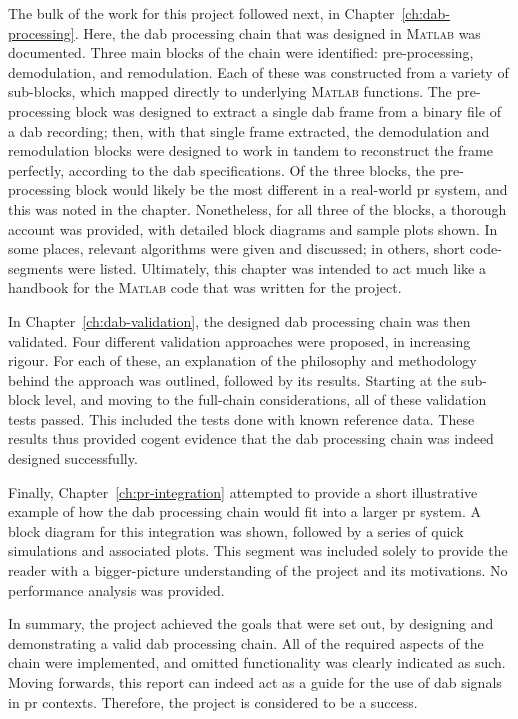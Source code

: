 \documentclass[class=report,11pt,crop=false]{standalone}
\begin{document}
The bulk of the work for this project followed next, in Chapter~\ref{ch:dab-processing}. Here, the \gls{dab} processing chain that was designed in \textsc{Matlab} was documented. Three main blocks of the chain were identified: pre-processing, demodulation, and remodulation. Each of these was constructed from a variety of sub-blocks, which mapped directly to underlying \textsc{Matlab} functions. The pre-processing block was designed to extract a single \gls{dab} frame from a binary file of a \gls{dab} recording; then, with that single frame extracted, the demodulation and remodulation blocks were designed to work in tandem to reconstruct the frame perfectly, according to the \gls{dab} specifications. Of the three blocks, the pre-processing block would likely be the most different in a real-world \gls{pr} system, and this was noted in the chapter. Nonetheless, for all three of the blocks, a thorough account was provided, with detailed block diagrams and sample plots shown. In some places, relevant algorithms were given and discussed; in others, short code-segments were listed. Ultimately, this chapter was intended to act much like a handbook for the \textsc{Matlab} code that was written for the project.

In Chapter~\ref{ch:dab-validation}, the designed \gls{dab} processing chain was then validated. Four different validation approaches were proposed, in increasing rigour. For each of these, an explanation of the philosophy and methodology behind the approach was outlined, followed by its results. Starting at the sub-block level, and moving to the full-chain considerations, all of these validation tests passed. This included the tests done with known reference data. These results thus provided cogent evidence that the \gls{dab} processing chain was indeed designed successfully.

Finally, Chapter~\ref{ch:pr-integration} attempted to provide a short illustrative example of how the \gls{dab} processing chain would fit into a larger \gls{pr} system. A block diagram for this integration was shown, followed by a series of quick simulations and associated plots. This segment was included solely to provide the reader with a bigger-picture understanding of the project and its motivations. No performance analysis was provided.

In summary, the project achieved the goals that were set out, by designing and demonstrating a valid \gls{dab} processing chain. All of the required aspects of the chain were implemented, and omitted functionality was clearly indicated as such.  Moving forwards, this report can indeed act as a guide for the use of \gls{dab} signals in \gls{pr} contexts. Therefore, the project is considered to be a success.

\ifstandalone

\printnoidxglossary[type=\acronymtype,nonumberlist]
\fi
\end{document}
